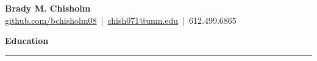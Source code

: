 \documentclass[12pt]{article} %
\begin{document}

\begin{center}
    \textbf{\Large Brady M. Chisholm} \\[1ex]
    \href{https://github.com/bchisholm08}{github.com/bchisholm08} \,|\, \href{mailto:chish071@umn.edu}{chish071@umn.edu} \,|\, 612.499.6865
\end{center}

\vspace{-.1in} %

{\fontsize{15}{12}\selectfont \textbf{Education}\\} %

\vspace{-.3in}

\rule{\textwidth}{0.05pt} %
\end{document}
